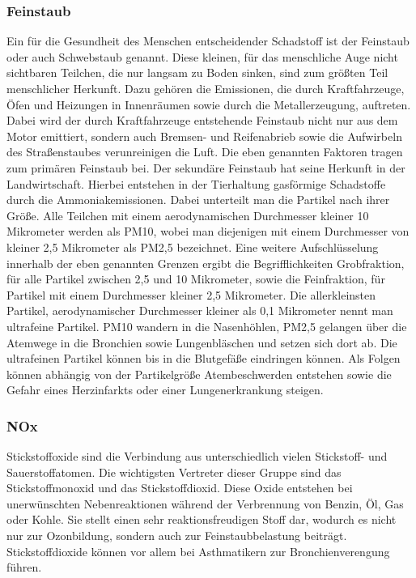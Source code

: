 \subsubsection{Feinstaub}
Ein für die Gesundheit des Menschen entscheidender Schadstoff ist der Feinstaub oder auch Schwebstaub genannt. Diese kleinen, für das menschliche Auge nicht sichtbaren Teilchen, die nur langsam zu Boden sinken, sind zum größten Teil menschlicher Herkunft. Dazu gehören die Emissionen, die durch Kraftfahrzeuge, Öfen und Heizungen in Innenräumen sowie durch die Metallerzeugung, auftreten. Dabei wird der durch Kraftfahrzeuge entstehende Feinstaub nicht nur aus dem Motor emittiert, sondern auch Bremsen- und Reifenabrieb sowie die Aufwirbeln des Straßenstaubes verunreinigen die Luft. Die eben genannten Faktoren tragen zum primären Feinstaub bei. Der sekundäre Feinstaub hat seine Herkunft in der Landwirtschaft. Hierbei entstehen in der Tierhaltung gasförmige Schadstoffe durch die Ammoniakemissionen. 
\newline
Dabei unterteilt man die Partikel nach ihrer Größe. Alle Teilchen mit einem aerodynamischen Durchmesser kleiner 10 Mikrometer werden als PM10, wobei man diejenigen mit einem Durchmesser von kleiner 2,5 Mikrometer als PM2,5 bezeichnet. Eine weitere Aufschlüsselung innerhalb der eben genannten Grenzen ergibt die Begrifflichkeiten Grobfraktion, für alle Partikel zwischen 2,5 und 10 Mikrometer, sowie die Feinfraktion, für Partikel mit einem Durchmesser kleiner 2,5 Mikrometer. Die allerkleinsten Partikel, aerodynamischer Durchmesser kleiner als 0,1 Mikrometer nennt man ultrafeine Partikel. PM10 wandern in die Nasenhöhlen, PM2,5 gelangen über die Atemwege in die Bronchien sowie Lungenbläschen und setzen sich dort ab. Die ultrafeinen Partikel können bis in die Blutgefäße eindringen können. Als Folgen können abhängig von der Partikelgröße Atembeschwerden entstehen sowie die Gefahr eines Herzinfarkts oder einer Lungenerkrankung steigen. \cite{UBA.Luft}

\subsubsection{\acs{NOx}}
Stickstoffoxide sind die Verbindung aus unterschiedlich vielen Stickstoff- und Sauerstoffatomen. Die wichtigsten Vertreter dieser Gruppe sind das Stickstoffmonoxid und das Stickstoffdioxid. Diese Oxide entstehen bei unerwünschten Nebenreaktionen während der Verbrennung von Benzin, Öl, Gas oder Kohle. Sie stellt einen sehr reaktionsfreudigen Stoff dar, wodurch es nicht nur zur Ozonbildung, sondern auch zur Feinstaubbelastung beiträgt. 
\newline
Stickstoffdioxide können vor allem bei Asthmatikern zur Bronchienverengung führen. \cite{UBA.Luft}

